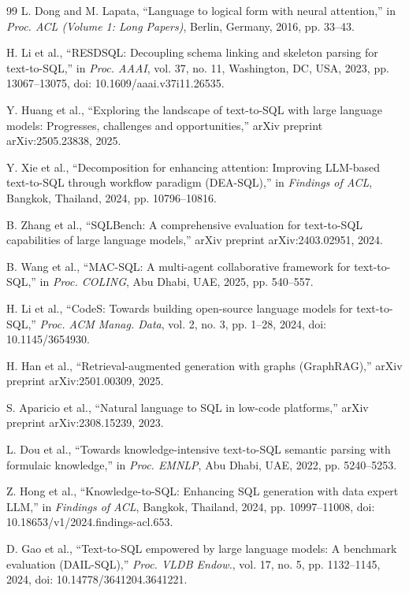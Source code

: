 \documentclass[journal]{IEEEtran}
\begin{document}
\begin{thebibliography}{99}
	L. Dong and M. Lapata, ``Language to logical form with neural attention,'' in \textit{Proc. ACL (Volume 1: Long Papers)}, Berlin, Germany, 2016, pp. 33--43.

	H. Li et al., ``RESDSQL: Decoupling schema linking and skeleton parsing for text-to-SQL,'' in \textit{Proc. AAAI}, vol. 37, no. 11, Washington, DC, USA, 2023, pp. 13067--13075, doi: 10.1609/aaai.v37i11.26535.

	Y. Huang et al., ``Exploring the landscape of text-to-SQL with large language models: Progresses, challenges and opportunities,'' arXiv preprint arXiv:2505.23838, 2025.

	Y. Xie et al., ``Decomposition for enhancing attention: Improving LLM-based text-to-SQL through workflow paradigm (DEA-SQL),'' in \textit{Findings of ACL}, Bangkok, Thailand, 2024, pp. 10796--10816.

	B. Zhang et al., ``SQLBench: A comprehensive evaluation for text-to-SQL capabilities of large language models,'' arXiv preprint arXiv:2403.02951, 2024.

	B. Wang et al., ``MAC-SQL: A multi-agent collaborative framework for text-to-SQL,'' in \textit{Proc. COLING}, Abu Dhabi, UAE, 2025, pp. 540--557.

	H. Li et al., ``CodeS: Towards building open-source language models for text-to-SQL,'' \textit{Proc. ACM Manag. Data}, vol. 2, no. 3, pp. 1--28, 2024, doi: 10.1145/3654930.

	H. Han et al., ``Retrieval-augmented generation with graphs (GraphRAG),'' arXiv preprint arXiv:2501.00309, 2025.

	S. Aparicio et al., ``Natural language to SQL in low-code platforms,'' arXiv preprint arXiv:2308.15239, 2023.

	L. Dou et al., ``Towards knowledge-intensive text-to-SQL semantic parsing with formulaic knowledge,'' in \textit{Proc. EMNLP}, Abu Dhabi, UAE, 2022, pp. 5240--5253.

	Z. Hong et al., ``Knowledge-to-SQL: Enhancing SQL generation with data expert LLM,'' in \textit{Findings of ACL}, Bangkok, Thailand, 2024, pp. 10997--11008, doi: 10.18653/v1/2024.findings-acl.653.

	D. Gao et al., ``Text-to-SQL empowered by large language models: A benchmark evaluation (DAIL-SQL),'' \textit{Proc. VLDB Endow.}, vol. 17, no. 5, pp. 1132--1145, 2024, doi: 10.14778/3641204.3641221.


\end{thebibliography}
\end{document}
